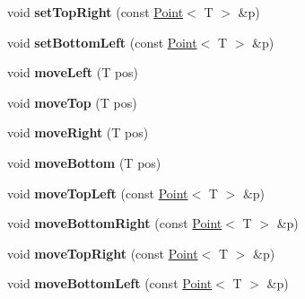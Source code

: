 \begin{DoxyCompactItemize}
\item 
\hypertarget{class_box_a87df2c9be2d8d144df1e47e1150b9132}{
void {\bfseries setTopRight} (const \hyperlink{class_point}{Point}$<$ T $>$ \&p)}
\label{class_box_a87df2c9be2d8d144df1e47e1150b9132}

\item 
\hypertarget{class_box_a228cf7f5dcfd1013b647d524a4ce5148}{
void {\bfseries setBottomLeft} (const \hyperlink{class_point}{Point}$<$ T $>$ \&p)}
\label{class_box_a228cf7f5dcfd1013b647d524a4ce5148}

\item 
\hypertarget{class_box_aa656edcbbfa8c22092bc2928e792db93}{
void {\bfseries moveLeft} (T pos)}
\label{class_box_aa656edcbbfa8c22092bc2928e792db93}

\item 
\hypertarget{class_box_a082c2eb93743c2bb2e8d2873a110bdb6}{
void {\bfseries moveTop} (T pos)}
\label{class_box_a082c2eb93743c2bb2e8d2873a110bdb6}

\item 
\hypertarget{class_box_a224e6b7f6da28d3e72d8abac92d0559f}{
void {\bfseries moveRight} (T pos)}
\label{class_box_a224e6b7f6da28d3e72d8abac92d0559f}

\item 
\hypertarget{class_box_a5a5a2ff82018b2b385ed3ad222b081e4}{
void {\bfseries moveBottom} (T pos)}
\label{class_box_a5a5a2ff82018b2b385ed3ad222b081e4}

\item 
\hypertarget{class_box_a25f13cb4c83114b15caa2d62675137bb}{
void {\bfseries moveTopLeft} (const \hyperlink{class_point}{Point}$<$ T $>$ \&p)}
\label{class_box_a25f13cb4c83114b15caa2d62675137bb}

\item 
\hypertarget{class_box_ae5103f2b496ac2f10105c41a336ec088}{
void {\bfseries moveBottomRight} (const \hyperlink{class_point}{Point}$<$ T $>$ \&p)}
\label{class_box_ae5103f2b496ac2f10105c41a336ec088}

\item 
\hypertarget{class_box_a13e447ff3e86e55f6cd66cd74a0d0c7a}{
void {\bfseries moveTopRight} (const \hyperlink{class_point}{Point}$<$ T $>$ \&p)}
\label{class_box_a13e447ff3e86e55f6cd66cd74a0d0c7a}

\item 
\hypertarget{class_box_a365ae8132302f9675d7d962fb7a8faec}{
void {\bfseries moveBottomLeft} (const \hyperlink{class_point}{Point}$<$ T $>$ \&p)}
\label{class_box_a365ae8132302f9675d7d962fb7a8faec}


\end{DoxyCompactItemize}

